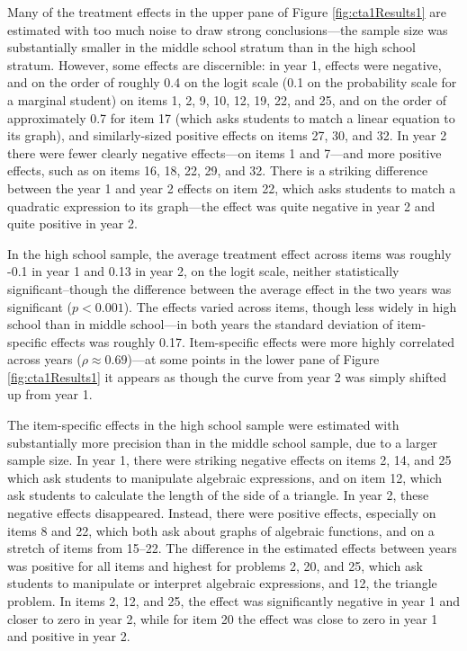 \documentclass{edm_article}
\begin{document}
Many of the treatment effects in the upper pane of Figure
\ref{fig:cta1Results1} are estimated with too much noise to draw strong
conclusions---the sample size was substantially smaller in the middle
school stratum than in the high school stratum.
However, some effects are discernible: in year 1, effects were
negative, and on the order of roughly 0.4 on the logit scale (0.1 on the
probability scale for a marginal student) on items 1, 2, 9, 10, 12,
19, 22, and 25, and on the order of approximately 0.7 for item 17
(which asks students to match a linear equation to its graph), and
similarly-sized positive effects on items 27, 30, and 32.
In year 2 there were fewer clearly negative effects---on items 1 and
7---and more positive effects, such as on items 16, 18, 22, 29, and 32. 
There is a striking difference between the year 1 and year 2 effects
on item 22, which asks students to match a quadratic expression to its
graph---the effect was quite negative in year 2 and quite
positive in year 2.

In the high school sample, the average treatment effect across items
was roughly -0.1 in year 1 and 0.13 in year 2, on the logit scale,
neither statistically significant--though the difference between the
average effect in the two years was significant ($p<0.001$).
The effects varied across items, though less widely in high school
than in middle school---in both years the standard deviation of
item-specific effects was roughly 0.17.
Item-specific effects were more highly correlated across years
($\rho\approx 0.69$)---at some points in the lower pane of Figure
\ref{fig:cta1Results1} it appears as though the curve from year 2 was
simply shifted up from year 1.

The item-specific effects in the high school sample were estimated
with substantially more precision than in the middle school sample,
due to a larger sample size.
In year 1, there were striking negative effects on items 2, 14, and 25
which ask students to manipulate algebraic expressions, and on item
12, which ask students to calculate the length of the side of a
triangle. In year 2, these negative effects disappeared. Instead,
there were positive effects, especially on items 8 and 22, which both
ask about graphs of algebraic functions, and on a stretch of items
from 15--22. The difference in the estimated effects between years was positive
for all items and highest
for problems 2, 20, and 25, which ask students to manipulate or
interpret algebraic expressions, and 12, the triangle problem. In
items 2, 12, and 25, the effect was significantly negative in year 1
and closer to zero in year 2, while for item 20 the effect was close
to zero in year 1 and positive in year 2. 
\end{document}
